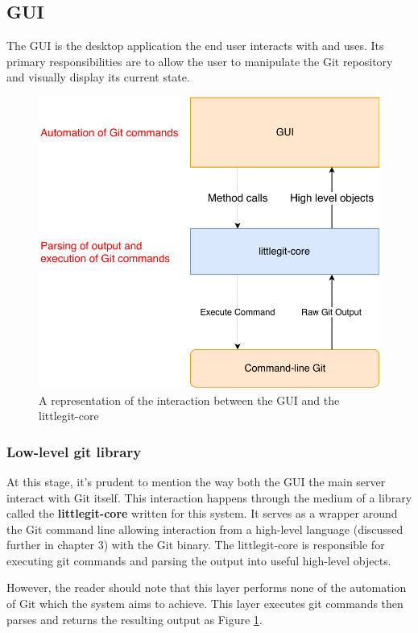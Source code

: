 \subsection{GUI}

The GUI is the desktop application the end user interacts with and uses. Its primary responsibilities are to allow the user to manipulate the Git repository and visually display its current state.

\begin{figure} 
    \centering
    \includegraphics[scale = 0.5]{figures/gui-core.pdf}
    \caption{A representation of the interaction between the GUI and the littlegit-core }
    \label{fig:gui-layers}
\end{figure}
\subsubsection{ Low-level git library}

At this stage, it's prudent to mention the way both the GUI the main server interact with Git itself. This interaction happens through the medium of a library called the \textbf{littlegit-core} written for this system. It serves as a wrapper around the Git command line allowing interaction from a high-level language (discussed further in chapter 3) with the Git binary. The littlegit-core is responsible for executing git commands and parsing the output into useful high-level objects.

However, the reader should note that this layer performs none of the automation of Git which the system aims to achieve. This layer executes git commands then parses and returns the resulting output as Figure \ref{fig:gui-layers}.

